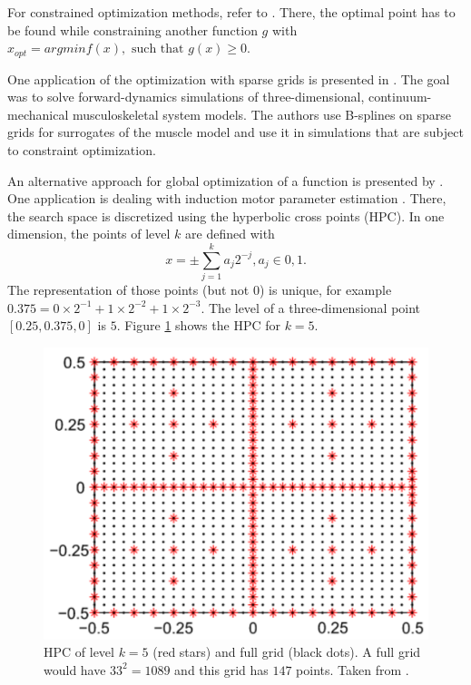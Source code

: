 For constrained optimization methods, refer to \cite{b_splines}. There, the optimal point has to be found while constraining another function $ g $ with $ x_{opt} = arg min f(x), \text{ such that } g(x) \ge 0 $. 
\newline 

One application of the optimization with sparse grids is presented in \cite{valentin2018gradient}. The goal was to solve forward-dynamics simulations of three-dimensional, continuum-mechanical musculoskeletal system models. The authors use B-splines on sparse grids for surrogates of the muscle model and use it in simulations that are subject to constraint optimization. 
\newline 

An alternative approach for global optimization of a function is presented by \cite{novak1996global}. One application is dealing with induction motor parameter estimation \cite{duan2016induction}. There, the search space is discretized using the hyperbolic cross points (HPC). In one dimension, the points of level $ k $ are defined with 
\begin{equation}
	x = \pm \sum_{j=1}^{k} a_j 2^{-j}, a_j \in {0,1}.
\end{equation}
The representation of those points (but not $ 0 $) is unique, for example $ 0.375 = 0 \times 2^{-1} + 1 \times 2^{-2} + 1 \times 2 ^{-3} $. The level of a three-dimensional point $ [0.25, 0.375, 0] $ is $ 5 $. Figure \ref{fig:hyperbolic} shows the HPC for $ k = 5 $.

\begin{figure}[H]
	\centering
	\includegraphics[scale=0.18]{figures/hyperbolic.png}
	\caption{ HPC of level $ k = 5 $ (red stars) and full grid (black dots). A full grid would have $ 33^2 = 1089 $ and this grid has $ 147 $ points. Taken from \cite{duan2016induction}.}
	\label{fig:hyperbolic}
\end{figure}

